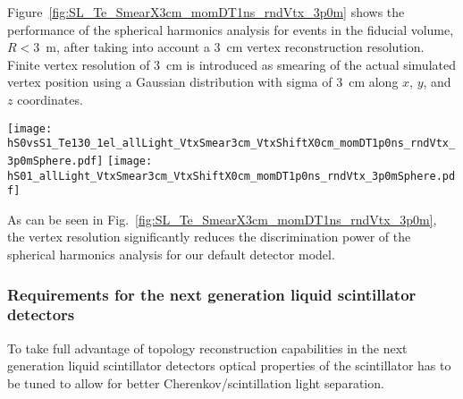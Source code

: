 Figure~\ref{fig:SL_Te_SmearX3cm_momDT1ns_rndVtx_3p0m} shows the performance of the spherical harmonics analysis for events 
in the fiducial volume, $R<$3~m, after taking into account a 3~cm vertex reconstruction resolution. Finite vertex resolution of 3~cm is
introduced as smearing of the actual simulated vertex position using a Gaussian distribution with sigma of 3~cm along $x$, $y$, and $z$ coordinates.

\begin{figure*}[h]
  \centering
  \texttt{[image: hS0vsS1\_Te130\_1el\_allLight\_VtxSmear3cm\_VtxShiftX0cm\_momDT1p0ns\_rndVtx\_3p0mSphere.pdf]}
  \texttt{[image: hS01\_allLight\_VtxSmear3cm\_VtxShiftX0cm\_momDT1p0ns\_rndVtx\_3p0mSphere.pdf]}
  \caption{\emph{Left:} Scatter plot of $S_0$ versus $S_1$ for a simulation of 1000 signal (\emph{red crosses}) and background
    (\emph{blue triangles}) events. Event verticies are uniformly distributed within the fiducial volume, $R<3$~m.
    Vetrex is smeared with 3~cm resolution. Differential cut of
    $\Delta t=t^{phot}_{measured} - t^{phot}_{predicted}<$1~ns is applied to select early PE sample.
    The default QE and 100\% photo-coverage is used in the simulation.
    Black dashed line corresponds to a linear fit to define 1-D variable $S_{01}$ (see text for details).
    \emph{Right:} Comparison of the $S_{01}$ distribution between signal (\emph{red solid line}) and background (\emph{blue dashed line}).}
\label{fig:SL_Te_SmearX3cm_momDT1ns_rndVtx_3p0m}
\end{figure*}

As can be seen in Fig.~\ref{fig:SL_Te_SmearX3cm_momDT1ns_rndVtx_3p0m}, the vertex resolution significantly reduces the discrimination power 
of the spherical harmonics analysis for our default detector model.



\subsubsection{Requirements for the next generation liquid scintillator detectors}
To take full advantage of topology reconstruction capabilities in the next generation liquid scintillator detectors optical properties of the 
scintillator has to be tuned to allow for better Cherenkov/scintillation light separation.

